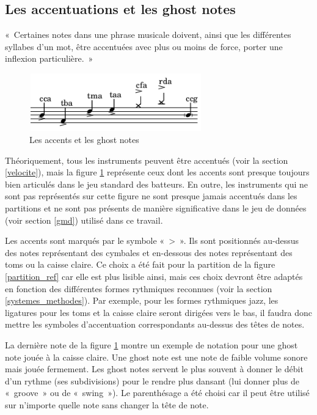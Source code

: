 \subsection*{Les accentuations et les ghost notes}
«~Certaines notes dans une phrase musicale doivent, ainsi que les différentes
syllabes d’un mot, être accentuées avec plus ou moins de force, porter une
inflexion particulière.~» \cite{danhauser}
\begin{figure}[h]
\centering
\includegraphics[height=25mm, width=75mm]{
z_images/3_methodes/0_notation_de_la_batterie/8_accents_et_ghost-notes_0.png}
\caption{Les accents et les ghost notes}
\label{accents_et_gn}
\end{figure}

Théoriquement, tous les instruments peuvent être accentués (voir la section
\ref{velocite}), mais la figure \ref{accents_et_gn} représente ceux dont les
accents sont presque toujours bien articulés dans le jeu standard des batteurs.
En outre, les instruments qui ne sont pas représentés sur cette
figure ne sont presque jamais accentués dans les partitions et ne sont pas
présents de manière significative dans le jeu de données (voir section \ref{gmd}) utilisé dans ce
travail.

Les accents sont marqués par le symbole «~>~». Ils sont positionnés au-dessus
des notes représentant des cymbales et en-dessous des notes représentant des
toms ou la caisse claire. Ce choix a été fait pour la partition de la figure
\ref{partition_ref} car elle est plus lisible ainsi, mais ces choix devront
être adaptés en fonction des différentes formes rythmiques reconnues
(voir la section \ref{systemes_methodes}). Par exemple, pour les
formes rythmiques jazz, les ligatures pour les toms et la caisse
claire seront dirigées vers le bas, il faudra donc mettre les symboles
d’accentuation correspondants au-dessus des têtes de notes.

La dernière note de la figure \ref{accents_et_gn} montre un exemple de notation
pour une ghost note jouée à la caisse claire. Une ghost note
\cite{lexique_drum} est une note de faible volume sonore mais jouée fermement.
Les ghost notes servent le plus souvent à donner le débit d’un rythme (ses
subdivisions) pour le rendre plus dansant (lui donner plus de «~groove~» ou de
«~swing~»). Le parenthésage a été choisi car il peut être utilisé sur n’importe
quelle note sans changer la tête de note.

